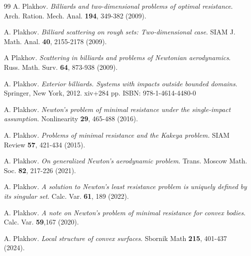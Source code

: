 \documentclass[a4paper,12pt]{article}
\theoremstyle{remark}
\theoremstyle{definition}
\begin{document}
\begin{thebibliography}{99}
A. Plakhov. {\it Billiards and two-dimensional problems of optimal resistance}. Arch. Ration. Mech. Anal. {\bf 194}, 349-382 (2009). %

A. Plakhov. {\it Billiard scattering on rough sets: Two-dimensional case}. SIAM J. Math. Anal. {\bf 40}, 2155-2178 (2009). %

A Plakhov. {\it Scattering in billiards and problems of Newtonian aerodynamics}. Russ. Math. Surv. {\bf 64}, 873-938 (2009).


A. Plakhov. {\it Exterior billiards. Systems with impacts outside bounded domains}. Springer, New York, 2012. xiv+284 pp. ISBN: 978-1-4614-4480-0

A. Plakhov. {\it Newton’s problem of minimal resistance under the single-impact assumption}. Nonlinearity {\bf 29}, 465-488 (2016).

A. Plakhov. {\it Problems of minimal resistance and the Kakeya problem.} SIAM Review {\bf 57}, 421-434 (2015). %


A. Plakhov. {\it On generalized Newton’s aerodynamic problem}. Trans. Moscow Math. Soc. {\bf 82}, 217-226 (2021).

A. Plakhov. {\it A solution to Newton's least resistance problem is uniquely defined by its singular set}. Calc. Var. {\bf 61}, 189 (2022). %

A. Plakhov. {\it A note on Newton's problem of minimal resistance for convex bodies}. Calc. Var. {\bf 59},167 (2020).

A. Plakhov. {\it Local structure of convex surfaces}. Sbornik Math {\bf 215}, 401-437 (2024).



\end{thebibliography}
\end{document}
